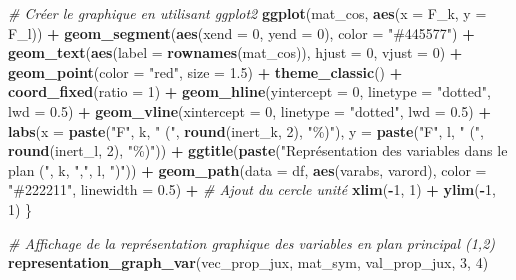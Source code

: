 \documentclass[
]{article}
\newenvironment{Shaded}{\begin{snugshade}}{\end{snugshade}}
\newcommand{\AttributeTok}[1]{\textcolor[rgb]{0.13,0.29,0.53}{#1}}
\newcommand{\CommentTok}[1]{\textcolor[rgb]{0.56,0.35,0.01}{\textit{#1}}}
\newcommand{\DecValTok}[1]{\textcolor[rgb]{0.00,0.00,0.81}{#1}}
\newcommand{\FloatTok}[1]{\textcolor[rgb]{0.00,0.00,0.81}{#1}}
\newcommand{\FunctionTok}[1]{\textcolor[rgb]{0.13,0.29,0.53}{\textbf{#1}}}
\newcommand{\NormalTok}[1]{#1}
\newcommand{\SpecialCharTok}[1]{\textcolor[rgb]{0.81,0.36,0.00}{\textbf{#1}}}
\newcommand{\StringTok}[1]{\textcolor[rgb]{0.31,0.60,0.02}{#1}}
\begin{document}
\begin{Shaded}
\begin{Highlighting}[]
  \CommentTok{\# Créer le graphique en utilisant ggplot2}
  \FunctionTok{ggplot}\NormalTok{(mat\_cos, }\FunctionTok{aes}\NormalTok{(}\AttributeTok{x =}\NormalTok{ F\_k, }\AttributeTok{y =}\NormalTok{ F\_l)) }\SpecialCharTok{+}
    \FunctionTok{geom\_segment}\NormalTok{(}\FunctionTok{aes}\NormalTok{(}\AttributeTok{xend =} \DecValTok{0}\NormalTok{, }\AttributeTok{yend =} \DecValTok{0}\NormalTok{), }\AttributeTok{color =} \StringTok{"\#445577"}\NormalTok{) }\SpecialCharTok{+}
    \FunctionTok{geom\_text}\NormalTok{(}\FunctionTok{aes}\NormalTok{(}\AttributeTok{label =} \FunctionTok{rownames}\NormalTok{(mat\_cos)), }\AttributeTok{hjust =} \DecValTok{0}\NormalTok{, }\AttributeTok{vjust =} \DecValTok{0}\NormalTok{) }\SpecialCharTok{+}
    \FunctionTok{geom\_point}\NormalTok{(}\AttributeTok{color =} \StringTok{"red"}\NormalTok{, }\AttributeTok{size =} \FloatTok{1.5}\NormalTok{) }\SpecialCharTok{+}
    \FunctionTok{theme\_classic}\NormalTok{() }\SpecialCharTok{+}
    \FunctionTok{coord\_fixed}\NormalTok{(}\AttributeTok{ratio =} \DecValTok{1}\NormalTok{) }\SpecialCharTok{+}
    \FunctionTok{geom\_hline}\NormalTok{(}\AttributeTok{yintercept =} \DecValTok{0}\NormalTok{, }\AttributeTok{linetype =} \StringTok{"dotted"}\NormalTok{, }\AttributeTok{lwd =} \FloatTok{0.5}\NormalTok{) }\SpecialCharTok{+}
    \FunctionTok{geom\_vline}\NormalTok{(}\AttributeTok{xintercept =} \DecValTok{0}\NormalTok{, }\AttributeTok{linetype =} \StringTok{"dotted"}\NormalTok{, }\AttributeTok{lwd =} \FloatTok{0.5}\NormalTok{) }\SpecialCharTok{+}
    \FunctionTok{labs}\NormalTok{(}\AttributeTok{x =} \FunctionTok{paste}\NormalTok{(}\StringTok{"F"}\NormalTok{, k, }\StringTok{" ("}\NormalTok{, }\FunctionTok{round}\NormalTok{(inert\_k, }\DecValTok{2}\NormalTok{), }\StringTok{"\%)"}\NormalTok{),}
         \AttributeTok{y =} \FunctionTok{paste}\NormalTok{(}\StringTok{"F"}\NormalTok{, l, }\StringTok{" ("}\NormalTok{, }\FunctionTok{round}\NormalTok{(inert\_l, }\DecValTok{2}\NormalTok{), }\StringTok{"\%)"}\NormalTok{)) }\SpecialCharTok{+}
    \FunctionTok{ggtitle}\NormalTok{(}\FunctionTok{paste}\NormalTok{(}\StringTok{"Représentation des variables dans le plan ("}\NormalTok{, k, }\StringTok{","}\NormalTok{, l, }\StringTok{")"}\NormalTok{)) }\SpecialCharTok{+}
    \FunctionTok{geom\_path}\NormalTok{(}\AttributeTok{data =}\NormalTok{ df, }\FunctionTok{aes}\NormalTok{(varabs, varord), }\AttributeTok{color =} \StringTok{"\#222211"}\NormalTok{, }\AttributeTok{linewidth =} \FloatTok{0.5}\NormalTok{) }\SpecialCharTok{+}  \CommentTok{\# Ajout du cercle unité}
    \FunctionTok{xlim}\NormalTok{(}\SpecialCharTok{{-}}\DecValTok{1}\NormalTok{, }\DecValTok{1}\NormalTok{) }\SpecialCharTok{+}
    \FunctionTok{ylim}\NormalTok{(}\SpecialCharTok{{-}}\DecValTok{1}\NormalTok{, }\DecValTok{1}\NormalTok{)}
\NormalTok{\}}

\CommentTok{\# Affichage de la représentation graphique des variables en plan principal (1,2)}
\FunctionTok{representation\_graph\_var}\NormalTok{(vec\_prop\_jux, mat\_sym, val\_prop\_jux, }\DecValTok{3}\NormalTok{, }\DecValTok{4}\NormalTok{)}
\end{Highlighting}
\end{Shaded}
\end{document}
